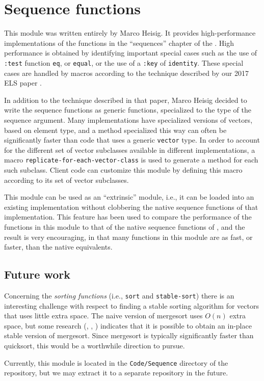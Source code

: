 \chapter{Sequence functions}

This module was written entirely by Marco Heisig.  It provides
high-performance implementations of the functions in the ``sequences''
chapter of the \hs{}.  High performance is obtained by identifying
important special cases such as the use of \texttt{:test} function
\texttt{eq}, or \texttt{equal}, or the use of a \texttt{:key} of
\texttt{identity}.  These special cases are handled by macros
according to the technique described by our 2017 ELS paper
\cite{Durand:2017:ELS:Sequence}.

In addition to the technique described in that paper, Marco Heisig
decided to write the sequence functions as generic functions,
specialized to the type of the sequence argument.  Many
implementations have specialized versions of vectors, based on element
type, and a method specialized this way can often be significantly
faster than code that uses a generic \texttt{vector} type.  In order
to account for the different set of vector subclasses available in
different \commonlisp{} implementations, a macro
\texttt{replicate-for-each-vector-class} is used to generate a method
for each such subclass.  Client code can customize this module by
defining this macro according to its set of vector subclasses.

This module can be used as an ``extrinsic'' module, i.e., it can be
loaded into an existing \commonlisp{} implementation without
clobbering the native sequence functions of that implementation.  This
feature has been used to compare the performance of the functions in
this module to that of the native sequence functions of \sbcl{}, and
the result is very encouraging, in that many functions in this module
are as fast, or faster, than the native \sbcl{} equivalents.

\section{Future work}
\label{sec-sequence-functions-future-work}

Concerning the \emph{sorting functions} (i.e., \texttt{sort} and
\texttt{stable-sort}) there is an interesting challenge with respect
to finding a stable sorting algorithm for vectors that uses little
extra space.  The naive version of mergesort uses $O(n)$ extra space,
but some research (\cite{Huang:1990:FSM:898863},
\cite{Huang:1988:PIM:42392.42403},
\cite{Katajainen:1996:PIM:642136.642138}) indicates that it is
possible to obtain an in-place stable version of mergesort.  Since
mergesort is typically significantly faster than quicksort, this would
be a worthwhile direction to pursue.

Currently, this module is located in the \texttt{Code/Sequence}
directory of the \sysname{} repository, but we may extract it to a
separate repository in the future.

